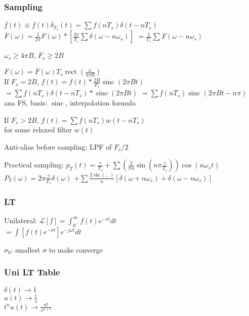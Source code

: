 \documentclass[4pt]{article}
\theoremstyle{definition}
\theoremstyle{definition}
\newcommand{\ulint}{\int_{0^-}^{\infty}}    %
\renewcommand{\o}{\omega}
\newcommand{\ra}{\rightarrow}
\DeclareMathOperator{\rect}{rect}
\DeclareMathOperator{\sinc}{sinc}
\begin{document}
\subsubsection {Sampling}
    \(\overline{f}(t)\equiv f(t) \delta_{T_s}(t) = \sum f(nT_s) \delta(t - nT_s)\)\\
    \(\overline{F}(\o) = \frac{1}{2\pi} F(\o) * [\frac{2\pi}{T_s} \sum\delta(\o - n\o_s)]\)
    \(= \frac{1}{T_s}\sum F(\o - n\o_s)\)

    $\o_s \geq 4\pi B$, $F_s \geq 2B$

    \(F(\o) = \overline{F}(\o) T_s \rect(\frac{\o}{4\pi B})\)\\   %
    If $F_s = 2B$, \(f(t) = \overline{f}(t) * \frac{2B}{F_s} \sinc(2\pi Bt)\)\\       %
    \(=\sum f(nT_s)\delta(t - nT_s) * \sinc(2\pi B t)\)
    \(= \sum f(nT_s) \sinc(2\pi Bt - n\pi)\)\\
    ana FS, basis: $\sinc$, interpolation formula

    If $F_s > 2B$, \(f(t) = \sum f(nT_s) w(t - nT_s)\)\\
    for some relaxed filter $w(t)$

    Anti-alias before sampling: LPF of $F_s/2$

    Practical sampling: \(p_T(t) = \frac{\tau}{T_s} + \sum(\frac{2}{\pi n}\sin(n\pi\frac{\tau}{T_s}))\cos(n\omega_s t)\)\\
    \(P_T(\o) = 2\pi \frac{\tau}{T_s}\delta(\o)\)
    \(+ \sum\frac{2\sin(...)}{n}[\delta(\o + n\o_s) + \delta(\o - n\o_s)]\)       %

\subsubsection{LT}
Unilateral: \(\mathcal{L}[f] = \ulint f(t) e^{-st} dt\)\\          %
\(= \int [f(t) e^{-\sigma t}] e^{-j\o t} dt\)

$\sigma_0$: smallest $\sigma$ to make converge
\subsubsection{Uni LT Table}
    $\delta(t) \ra 1$\\
    $u(t) \ra \frac{1}{s}$\\
    $t^n u(t) \ra \frac{n!}{s^{n+1}}$               %
\end{document}
